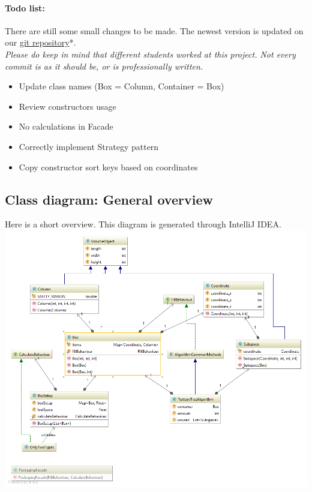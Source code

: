 \documentclass[a4paper,12pt]{article}
\begin{document}
\paragraph{Todo list:} 
There are still some small changes to be made. The newest version is updated on our \hyperref{https://github.com/WannesFransen1994/3D_Bin_Packaging}{}{}{git repository}*.\\
\small \textit{Please do keep in mind that different students worked at this project. Not every commit is as it should be, or is professionally written.}
\begin{itemize}
	\item[] \checkmark Update class names (Box = Column, Container = Box)
	\item[] \checkmark Review constructors usage
	\item[] \checkmark No calculations in Facade
	\item[] \checkmark Correctly implement Strategy pattern
	\item[] \xmark \space Copy constructor sort keys based on coordinates
\end{itemize}
\pagebreak

\subsection{Class diagram: General overview}
Here is a short overview. This diagram is generated through IntelliJ IDEA.\\

\includegraphics[width=17cm]{Class_diagram_overview2.png}\\
\end{document}
